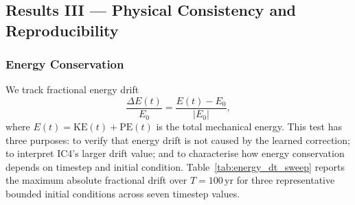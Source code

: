\documentclass[12pt]{article}
\begin{document}

\subsection{Results III --- Physical Consistency and Reproducibility}
\label{sec:physical}

\subsubsection{Energy Conservation}
\label{sec:energy}

We track fractional energy drift
\[
    \frac{\Delta E(t)}{E_0}
    = \frac{E(t) - E_0}{\lvert E_0 \rvert},
\]
where $E(t) = \mathrm{KE}(t)+\mathrm{PE}(t)$ is the total mechanical
energy. This test has three purposes: to verify that energy drift is
not caused by the learned correction; to interpret IC4's larger drift
value; and to characterise how energy conservation depends on timestep
and initial condition.
Table~\ref{tab:energy_dt_sweep} reports the maximum absolute
fractional drift over $T=100$\,yr for three representative bounded
initial conditions across seven timestep values.

\begin{table}[H]
\centering
\caption{Maximum fractional energy drift $|\Delta E/E_0|_{\max}$ for \texttt{SIMON} over $T=100$\,yr. The main experiments use $dt=0.04$\,yr.}
\label{tab:energy_dt_sweep}
\end{table}
\end{document}
